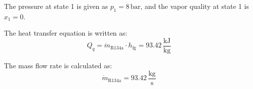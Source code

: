 The pressure at state 1 is given as \( p_1 = 8 \, \text{bar} \), and the vapor quality at state 1 is \( x_1 = 0 \).  

The heat transfer equation is written as:  
\[
Q_q = \dot{m}_{\text{R134a}} \cdot h_{\text{fg}} = 93.42 \, \frac{\text{kJ}}{\text{kg}}
\]  

The mass flow rate is calculated as:  
\[
\dot{m}_{\text{R134a}} = 93.42 \, \frac{\text{kg}}{\text{s}}
\]